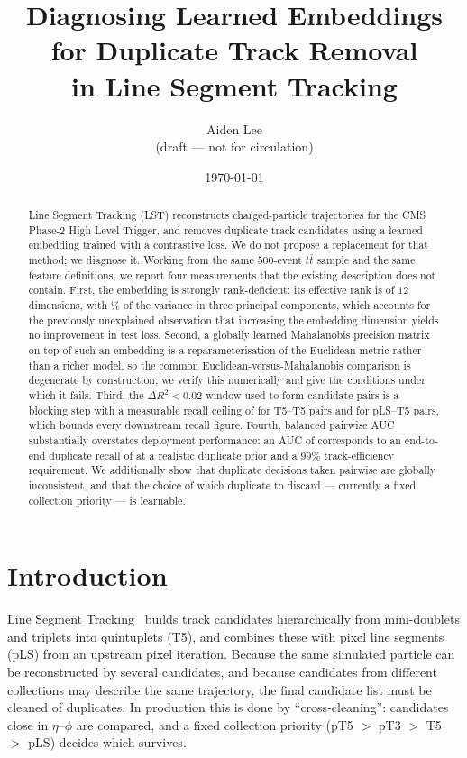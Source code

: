 \documentclass[11pt]{article}
\title{Diagnosing Learned Embeddings for Duplicate Track Removal\\
in Line Segment Tracking}
\author{Aiden Lee \\ \small (draft --- not for circulation)}
\date{\today}
\newcommand{\dRsq}{\Delta R^2}
\begin{document}
\maketitle

\begin{abstract}
Line Segment Tracking (LST) reconstructs charged-particle trajectories for the
CMS Phase-2 High Level Trigger, and removes duplicate track candidates using a
learned embedding trained with a contrastive loss. We do not propose a
replacement for that method; we diagnose it. Working from the same $500$-event
$t\bar{t}$ sample and the same feature definitions, we report four measurements
that the existing description does not contain. First, the embedding is
strongly rank-deficient: its effective rank is \RankMeEucl{} of $12$ dimensions,
with \VarTopThree\% of the variance in three principal components, which
accounts for the previously unexplained observation that increasing the
embedding dimension yields no improvement in test loss. Second, a globally
learned Mahalanobis precision matrix on top of such an embedding is a
reparameterisation of the Euclidean metric rather than a richer model, so the
common Euclidean-versus-Mahalanobis comparison is degenerate by construction; we
verify this numerically and give the conditions under which it fails. Third, the
$\dRsq<0.02$ window used to form candidate pairs is a blocking step with a
measurable recall ceiling of \CeilingTfive{} for T5--T5 pairs and \CeilingCross{}
for pLS--T5 pairs, which bounds every downstream recall figure. Fourth, balanced
pairwise AUC substantially overstates deployment performance: an AUC of
\AucEucl{} corresponds to an end-to-end duplicate recall of \RecallEndToEnd{} at
a realistic duplicate prior and a $99\%$ track-efficiency requirement. We
additionally show that duplicate decisions taken pairwise are globally
inconsistent, and that the choice of which duplicate to discard --- currently a
fixed collection priority --- is learnable.
\end{abstract}

\section{Introduction}
\label{sec:intro}

Line Segment Tracking~\cite{lst2022,segmentlinking} builds track candidates
hierarchically from mini-doublets and triplets into quintuplets (T5), and
combines these with pixel line segments (pLS) from an upstream pixel iteration.
Because the same simulated particle can be reconstructed by several candidates,
and because candidates from different collections may describe the same
trajectory, the final candidate list must be cleaned of duplicates. In
production this is done by ``cross-cleaning'': candidates close in $\eta$--$\phi$
are compared, and a fixed collection priority (pT5 $>$ pT3 $>$ T5 $>$ pLS)
decides which survives.
\end{document}
